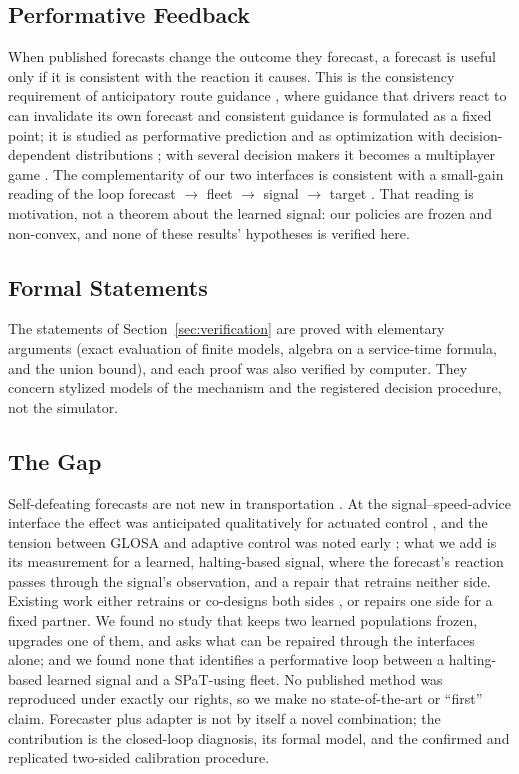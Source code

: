\subsection{Performative Feedback}
When published forecasts change the outcome they forecast, a forecast is useful only if it is consistent with the reaction it causes. This
is the consistency requirement of anticipatory route guidance \cite{bottom2000}, where guidance that drivers react to can invalidate its own
forecast and consistent guidance is formulated as a fixed point; it is studied as performative prediction \cite{perdomo2020} and
as optimization with decision-dependent distributions \cite{drusvyatskiy2023}; with several decision makers it becomes a multiplayer game
\cite{narang2023}. The complementarity of our two interfaces is consistent with a small-gain reading of the loop forecast $\to$ fleet
$\to$ signal $\to$ target \cite{jiang1994,dashkovskiy2007}. That reading is motivation, not a theorem about the learned signal: our
policies are frozen and non-convex, and none of these results' hypotheses is verified here.

\subsection{Formal Statements}
The statements of Section~\ref{sec:verification} are proved with elementary arguments (exact evaluation of finite models, algebra on a
service-time formula, and the union bound), and each proof was also verified by computer. They concern stylized models of the mechanism
and the registered decision procedure, not the simulator.

\subsection{The Gap}
Self-defeating forecasts are not new in transportation \cite{bottom2000}. At the signal--speed-advice interface the effect was
anticipated qualitatively for actuated control \cite{genser2024}, and the tension between GLOSA and adaptive control was noted early
\cite{erdmann2013}; what we add is its measurement for a learned, halting-based signal, where the forecast's reaction passes through the
signal's observation, and a repair that retrains neither side. Existing work either retrains
or co-designs both sides \cite{guo2023,zhang2026,gerner2026forl}, or repairs one side for a fixed partner. We found no study that keeps two learned
populations frozen, upgrades one of them, and asks what can be repaired through the interfaces alone; and we found none that identifies a
performative loop between a halting-based learned signal and a SPaT-using fleet. No published method was reproduced under exactly our
rights, so we make no state-of-the-art or ``first'' claim. Forecaster plus adapter is not by itself a novel combination; the contribution
is the closed-loop diagnosis, its formal model, and the confirmed and replicated two-sided calibration procedure.

